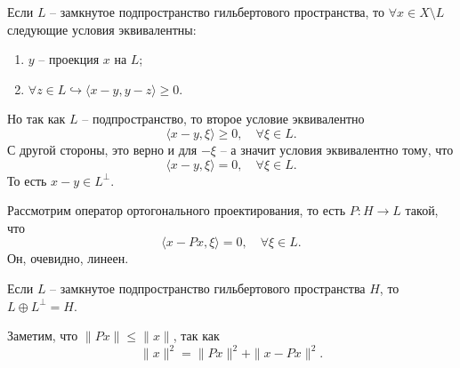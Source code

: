 \begin{corollary}
    Если $L$ -- замкнутое подпространство гильбертового пространства, то $\forall x \in X \setminus L$
    следующие условия эквивалентны:
    \begin{enumerate}
        \item $y$ -- проекция $x$ на $L$;
        \item $\forall z \in L \hookrightarrow \langle x - y, y - z \rangle \geq 0$.
    \end{enumerate}
    Но так как $L$ -- подпространство, то второе условие эквивалентно
    \[
        \langle x - y, \xi \rangle \geq 0,\quad  \forall \xi \in L.
    \]
    С другой стороны, это верно и для $-\xi$ -- а значит условия эквивалентно тому, что
    \[
        \langle x - y, \xi \rangle = 0, \quad \forall \xi \in L.
    \]
    То есть $x - y \in L^{\perp}$.

    Рассмотрим оператор ортогонального проектирования, то есть $P\colon H \to L$ такой, что
    \[
        \langle x - Px, \xi \rangle = 0, \quad \forall \xi \in L.
    \]
    Он, очевидно, линеен.
\end{corollary}
\begin{theorem}
    Если $L$ -- замкнутое подпространство гильбертового пространства $H$, то $L \oplus L^{\perp} = H$.
\end{theorem}
\begin{note}
    Заметим, что $\|Px\| \leq \|x\|$, так как
    \[
        \|x\|^2 = \|Px\|^2 + \|x - Px\|^2.
    \]
\end{note}